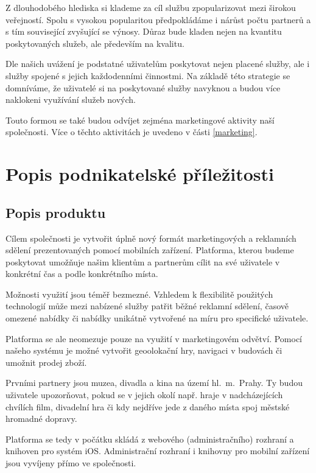 \documentclass[12pt,czech]{article}
\begin{document}
\medskip

Z dlouhodobého hlediska si klademe za cíl službu zpopularizovat mezi širokou veřejností.
Spolu s vysokou popularitou předpokládáme i nárůst počtu partnerů a s tím související zvyšující se výnosy.
Důraz bude kladen nejen na kvantitu poskytovaných služeb, ale především na kvalitu.

Dle našich uvážení je podstatné uživatelům poskytovat nejen placené služby, ale i služby spojené s jejich každodenními činnostmi.
Na základě této strategie se domníváme, že uživatelé si na poskytované služby navyknou a budou více naklokeni využívání služeb nových.

Touto formou se také budou odvíjet zejména marketingové aktivity naší společnosti.
Více o těchto aktivitách je uvedeno v části \ref{marketing}.

\newpage
\section{Popis podnikatelské příležitosti}

\subsection{Popis produktu}

Cílem společnosti je vytvořit úplně nový formát marketingových a reklamních sdělení prezentovaných pomocí mobilních zařízení.
Platforma, kterou budeme poskytovat umožňuje našim klientům a partnerům cílit na své uživatele v konkrétní čas a podle konkrétního místa.

Možnosti využití jsou téměř bezmezné.
Vzhledem k flexibilitě použitých technologií může mezi nabízené služby patřit běžné reklamní sdělení, časově omezené nabídky či nabídky unikátně vytvořené na míru pro specifické uživatele.

Platforma se ale neomezuje pouze na využití v marketingovém odvětví.
Pomocí našeho systému je možné vytvořit geoolokační hry, navigaci v budovách či umožnit prodej zboží.

\medskip

Prvními partnery jsou muzea, divadla a kina na území hl.~m.~Prahy.
Ty budou uživatele upozorňovat, pokud se v jejich okolí např. hraje v nadcházejících chvílích film, divadelní hra či kdy nejdříve jede z daného místa spoj městské hromadné dopravy.

\medskip

Platforma se tedy v počátku skládá z webového (administračního) rozhraní a knihoven pro systém iOS.
Administrační rozhraní i knihovny pro mobilní zařízení jsou vyvíjeny přímo ve společnosti.
\end{document}
